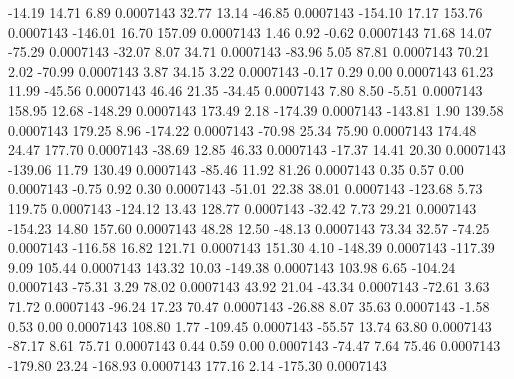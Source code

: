       -14.19       14.71        6.89     0.0007143
       32.77       13.14      -46.85     0.0007143
     -154.10       17.17      153.76     0.0007143
     -146.01       16.70      157.09     0.0007143
        1.46        0.92       -0.62     0.0007143
       71.68       14.07      -75.29     0.0007143
      -32.07        8.07       34.71     0.0007143
      -83.96        5.05       87.81     0.0007143
       70.21        2.02      -70.99     0.0007143
        3.87       34.15        3.22     0.0007143
       -0.17        0.29        0.00     0.0007143
       61.23       11.99      -45.56     0.0007143
       46.46       21.35      -34.45     0.0007143
        7.80        8.50       -5.51     0.0007143
      158.95       12.68     -148.29     0.0007143
      173.49        2.18     -174.39     0.0007143
     -143.81        1.90      139.58     0.0007143
      179.25        8.96     -174.22     0.0007143
      -70.98       25.34       75.90     0.0007143
      174.48       24.47      177.70     0.0007143
      -38.69       12.85       46.33     0.0007143
      -17.37       14.41       20.30     0.0007143
     -139.06       11.79      130.49     0.0007143
      -85.46       11.92       81.26     0.0007143
        0.35        0.57        0.00     0.0007143
       -0.75        0.92        0.30     0.0007143
      -51.01       22.38       38.01     0.0007143
     -123.68        5.73      119.75     0.0007143
     -124.12       13.43      128.77     0.0007143
      -32.42        7.73       29.21     0.0007143
     -154.23       14.80      157.60     0.0007143
       48.28       12.50      -48.13     0.0007143
       73.34       32.57      -74.25     0.0007143
     -116.58       16.82      121.71     0.0007143
      151.30        4.10     -148.39     0.0007143
     -117.39        9.09      105.44     0.0007143
      143.32       10.03     -149.38     0.0007143
      103.98        6.65     -104.24     0.0007143
      -75.31        3.29       78.02     0.0007143
       43.92       21.04      -43.34     0.0007143
      -72.61        3.63       71.72     0.0007143
      -96.24       17.23       70.47     0.0007143
      -26.88        8.07       35.63     0.0007143
       -1.58        0.53        0.00     0.0007143
      108.80        1.77     -109.45     0.0007143
      -55.57       13.74       63.80     0.0007143
      -87.17        8.61       75.71     0.0007143
        0.44        0.59        0.00     0.0007143
      -74.47        7.64       75.46     0.0007143
     -179.80       23.24     -168.93     0.0007143
      177.16        2.14     -175.30     0.0007143
